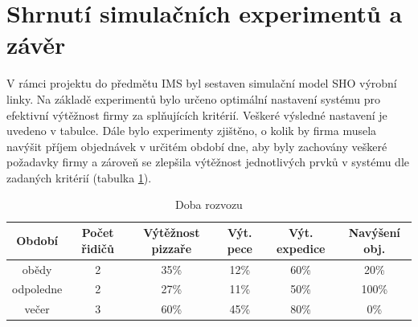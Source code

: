 \documentclass[a4paper, 12pt]{article}[9.12.2013]
\begin{document}
\section{Shrnutí simulačních experimentů a závěr} \label{zaver}
V rámci projektu do předmětu IMS byl sestaven simulační model SHO výrobní
linky. Na základě experimentů bylo určeno optimální nastavení systému pro
efektivní výtěžnost firmy za splňujících kritérií. Veškeré výsledné nastavení
je uvedeno v tabulce.  Dále bylo experimenty zjištěno, o kolik by firma musela
navýšit příjem objednávek v určitém období dne, aby byly zachovány veškeré
požadavky firmy a zároveň se zlepšila výtěžnost jednotlivých prvků v systému
dle zadaných kritérií (tabulka \ref{tab:final}).

\begin{table}[h]
\begin{tabular}{ c | c | c | c | c | c }
    Období & Počet řidičů & Výtěžnost pizzaře & Výt. pece & Výt. expedice & Navýšení obj.\\
    \hline
    obědy     & 2 & 35\% & 12\% & 60\% & 20\%\\
    odpoledne & 2 & 27\% & 11\% & 50\% & 100\%\\
    večer     & 3 & 60\% & 45\% & 80\% & 0\%
\end{tabular}
\caption{Doba rozvozu}
\label {tab:final}
\end{table}
\end{document}
